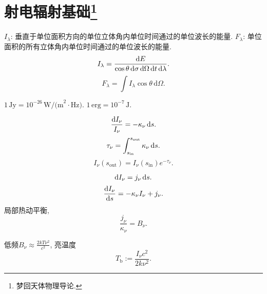 \chapter[射电辐射基础]{射电辐射基础\footnote{梦回天体物理导论.}}

$I_\lambda$: 垂直于单位面积方向的单位立体角内单位时间通过的单位波长的能量. 
$F_\lambda$: 单位面积的所有立体角内单位时间通过的单位波长的能量.
\begin{equation}
    I_\lambda=\frac{\mathrm{d} E}{\cos\theta\,\mathrm{d}\sigma\,\mathrm{d}\Omega\,\mathrm{d} t\,\mathrm{d}\lambda}.
\end{equation}
\begin{equation}
    F_\lambda = \int I_\lambda \cos\theta \,\mathrm{d}\Omega.
\end{equation}

$1\,\text{Jy}=10^{-26}\,\text{W/(m}^2\!\cdot\text{Hz)}$. $1\,\text{erg}=10^{-7}\,\text{J}$.

\begin{equation}
    \frac{\mathrm{d} I_\nu}{I_\nu}=-\kappa_\nu\,\mathrm{d} s.
\end{equation}
\begin{equation}
    \tau_\nu=\int_{s_\text{in}}^{s_\text{out}}\kappa_\nu\,\mathrm{d} s.
\end{equation}
\begin{equation}
    I_\nu(s_\text{out})=I_\nu(s_\text{in})e^{-\tau_\nu}.
\end{equation}

\begin{equation}
    \mathrm{d} I_\nu=j_\nu\,\mathrm{d} s.
\end{equation}
\begin{equation}
    \frac{\mathrm{d} I_\nu}{\mathrm{d} s}=-\kappa_\nu I_\nu+j_\nu.
\end{equation}
局部热动平衡,
\begin{equation}
    \frac{j_\nu}{\kappa_\nu}=B_\nu.
\end{equation}

低频$B_\nu\approx\frac{2kT\nu^2}{c^2}$, 亮温度
\begin{equation}
    T_\text{b}:=\frac{I_\nu c^2}{2k\nu^2}.
\end{equation}
